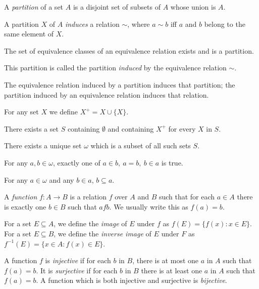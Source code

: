 \begin{defn}
  A \emph{partition} of a set $A$ is a disjoint set of subsets of $A$ whose
  union is $A$.

  A partition $X$ of $A$ \emph{induces} a relation $\sim$, where $a\sim b$ iff
  $a$ and $b$ belong to the same element of $X$.
\end{defn}
\begin{prop}
  The set of equivalence classes of an equivalence relation exists and 
  is a partition.
\end{prop}
\begin{defn}
  This partition is called the partition \emph{induced} by the equivalence
  relation $\sim$.
\end{defn}
\begin{prop}
  The equivalence relation induced by a partition induces that partition; the
  partition induced by an equivalence relation induces that relation.
\end{prop}
\begin{defn}
  For any set $X$ we define $X^+=X\cup\{X\}$.
\end{defn}
\begin{axiom}[Infinity]
  There exists a set $S$ containing $\emptyset$ and containing $X^+$ for
  every $X$ in $S$.
\end{axiom}
\begin{prop}
  There exists a unique set $\omega$ which is a subset of all such sets $S$.
\end{prop}
\begin{prop}
  For any $a,b\in\omega$, exactly one of $a\in b,\ a=b,\ b\in a$ is true.
\end{prop}
\begin{prop}
  For any $a\in\omega$ and any $b\in a$, $b\subseteq a$.
\end{prop}
\begin{defn}
  A \emph{function} $f:A\to B$ is a relation $f$ over $A$ and $B$ such that
  for each $a\in A$ there is exactly one $b\in B$ such that $afb$. We usually
  write this as $f(a)=b$.

  For a set $E\subseteq A$, we define the \emph{image} of $E$ under $f$ as
  $f(E)=\{f(x):x\in E\}$. For a set $E\subseteq B$, we define the \emph{inverse
    image} of $E$ under $F$ as $f^{-1}(E)=\{x\in A:f(x)\in E\}$.

  A function $f$ is \emph{injective} if for each $b$ in $B$, there is at most one
  $a$ in $A$ such that $f(a)=b$. It is \emph{surjective} if for each $b$ in
  $B$ there is at least one $a$ in $A$ such that $f(a)=b$. A function which is
  both injective and surjective is \emph{bijective}.
\end{defn}
